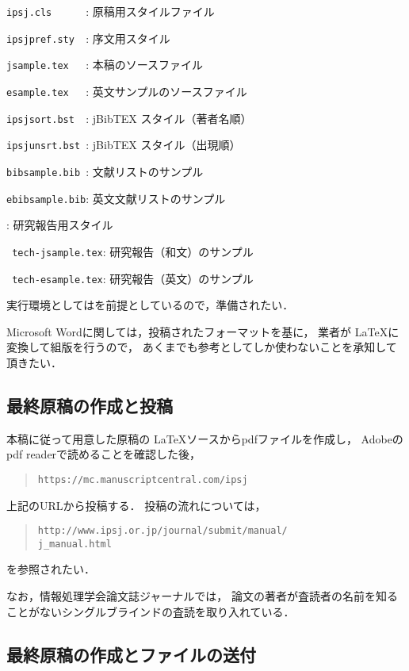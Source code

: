 \documentclass[submit]{ipsj}
\def\|{\verb|}
\begin{document}
\begin{Enumerate}
\item \|ipsj.cls      |: 原稿用スタイルファイル
\item \|ipsjpref.sty  |: 序文用スタイル
\item \|jsample.tex   |: 本稿のソースファイル
\item \|esample.tex   |: 英文サンプルのソースファイル
\item \|ipsjsort.bst  |: jBibTEX スタイル（著者名順）
\item \|ipsjunsrt.bst |: jBibTEX スタイル（出現順）
\item \|bibsample.bib |: 文献リストのサンプル
\item \|ebibsample.bib|: 英文文献リストのサンプル
\item {}: 研究報告用スタイル
\item \| tech-jsample.tex|: 研究報告（和文）のサンプル
\item \| tech-esample.tex|: 研究報告（英文）のサンプル
\end{Enumerate}%
実行環境としては\LaTeXe を前提としているので，準備されたい．


Microsoft Wordに関しては，投稿されたフォーマットを基に，
業者が \LaTeX に変換して組版を行うので，
あくまでも参考としてしか使わないことを承知して頂きたい．



\subsection{最終原稿の作成と投稿}

本稿に従って用意した原稿の \LaTeX ソースからpdfファイルを作成し，
Adobeのpdf readerで読めることを確認した後，
\begin{quote}
\small
\|https://mc.manuscriptcentral.com/ipsj|
\end{quote}
上記のURLから投稿する．
投稿の流れについては，
\begin{quote}
\small
\|http://www.ipsj.or.jp/journal/submit/manual/|\\
\|j_manual.html|
\end{quote}
を参照されたい．



なお，情報処理学会論文誌ジャーナルでは，
論文の著者が査読者の名前を知ることがないシングルブラインドの査読を取り入れている．




\subsection{最終原稿の作成とファイルの送付}
\end{document}

